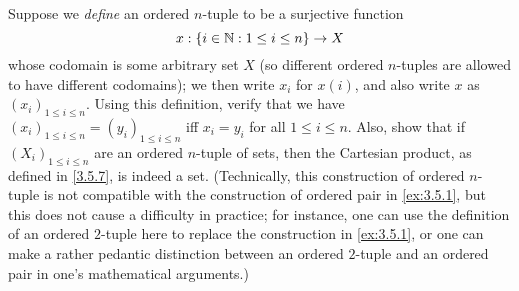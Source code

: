 \begin{ex}\label{ex:3.5.2}
	Suppose we \emph{define} an ordered \(n\)-tuple to be a surjective function
	\[
		x : \left\lbrace i \in \mathbb{N} : 1 \leq i \leq n\right\rbrace \to X
	\]
	whose codomain is some arbitrary set \(X\) (so different ordered \(n\)-tuples are allowed to have different codomains);
	we then write \(x_i\) for \(x(i)\), and also write \(x\) as \((x_i)_{1 \leq i \leq n}\).
	Using this definition, verify that we have \((x_i)_{1 \leq i \leq n} = (y_i)_{1 \leq i \leq n}\) iff \(x_i = y_i\) for all \(1 \leq i \leq n\).
	Also, show that if \((X_i)_{1 \leq i \leq n}\) are an ordered \(n\)-tuple of sets, then the Cartesian product, as defined in \cref{3.5.7}, is indeed a set.
	(Technically, this construction of ordered \(n\)-tuple is not compatible with the construction of ordered pair in \cref{ex:3.5.1}, but this does not cause a difficulty in practice;
	for instance, one can use the definition of an ordered \(2\)-tuple here to replace the construction in \cref{ex:3.5.1}, or one can make a rather pedantic distinction between an ordered \(2\)-tuple and an ordered pair in one's mathematical arguments.)
\end{ex}

